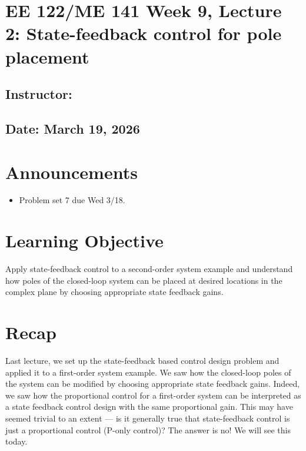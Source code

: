 \documentclass{ee122_notes}
\renewcommand{\releasedate}{March 19, 2026}
\begin{document}
\section*{EE 122/ME 141 Week 9, Lecture 2: State-feedback control for pole placement}
\subsection*{Instructor: \instructor}
\subsection*{Date: \releasedate}
\section{Announcements}
\begin{itemize}
    \item Problem set 7 due Wed 3/18.
\end{itemize}
\section{Learning Objective}
 Apply state-feedback control to a second-order system example and understand how poles of the closed-loop system can be placed at desired locations in the complex plane by choosing appropriate state feedback gains.
\section{Recap}
Last lecture, we set up the state-feedback based control design problem and applied it to a first-order system example. We saw how the closed-loop poles of the system can be modified by choosing appropriate state feedback gains. Indeed, we saw how the proportional control for a first-order system can be interpreted as a state feedback control design with the same proportional gain. This may have seemed trivial to an extent --- is it generally true that state-feedback control is just a proportional control (P-only control)? The answer is no! We will see this today.
\end{document}

